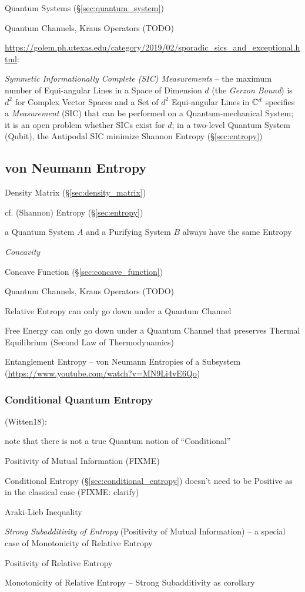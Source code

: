 Quantum Systems (\S\ref{sec:quantum_system})

Quantum Channels, Kraus Operators (TODO)

\url{https://golem.ph.utexas.edu/category/2019/02/sporadic_sics_and_exceptional.html}:

\emph{Symmetic Informationally Complete (SIC) Measurements} -- the maximum
number of Equi-angular Lines in a Space of Dimension $d$ (the \emph{Gerzon
  Bound}) is $d^2$ for Complex Vector Spaces and a Set of $d^2$ Equi-angular
Lines in $\mathbb{C}^d$ specifies a \emph{Measurement} (SIC) that can be performed
on a Quantum-mechanical System;
it is an open problem whether SICs exist for $d$; in a two-level Quantum System
(Qubit), the Antipodal SIC minimize Shannon Entropy (\S\ref{sec:entropy})



\subsection{von Neumann Entropy}\label{sec:vonneumann_entropy}

Density Matrix (\S\ref{sec:density_matrix})

cf. (Shannon) Entropy (\S\ref{sec:entropy})

a Quantum System $A$ and a Purifying System $B$ always have the same Entropy

\emph{Concavity}

Concave Function (\S\ref{sec:concave_function})

Quantum Channels, Kraus Operators (TODO)

Relative Entropy can only go down under a Quantum Channel

Free Energy can only go down under a Quantum Channel that preserves Thermal
Equilibrium (Second Law of Thermodynamics)

Entanglement Entropy -- von Neumann Entropies of a Subsystem
(\url{https://www.youtube.com/watch?v=MN9Li4vE6Qo})



\subsubsection{Conditional Quantum Entropy}
\label{sec:conditional_quantum_entropy}

(Witten18):

note that there is not a true Quantum notion of ``Conditional''

Positivity of Mutual Information (FIXME)

Conditional Entropy (\S\ref{sec:conditional_entropy}) doesn't need to be
Positive as in the classical case (FIXME: clarify)

Araki-Lieb Inequality

\emph{Strong Subadditivity of Entropy} (Positivity of Mutual Information) --
a special case of Monotonicity of Relative Entropy

Positivity of Relative Entropy

Monotonicity of Relative Entropy -- Strong Subadditivity as corollary
